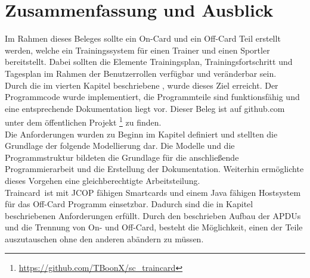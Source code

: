 \clearpage
\section{Zusammenfassung und Ausblick}
\label{sec:4}

Im Rahmen dieses Beleges sollte ein On-Card und ein Off-Card Teil erstellt werden, welche ein Trainingssystem für einen Trainer und einen Sportler bereitstellt.
Dabei sollten die Elemente Trainingsplan, Trainingsfortschritt und Tagesplan im Rahmen der Benutzerrollen verfügbar und veränderbar sein.
\\

Durch die im vierten Kapitel beschriebene , wurde dieses Ziel erreicht. Der Programmcode wurde implementiert, die Programmteile sind funktionsfähig und eine entsprechende Dokumentation liegt vor. Dieser Beleg ist auf github.com unter dem öffentlichen Projekt \footnote{\url{https://github.com/TBoonX/sc_traincard}} zu finden.
\\

Die Anforderungen wurden zu Beginn im Kapitel  definiert und stellten die Grundlage der folgende Modellierung dar.
Die Modelle und die Programmstruktur bildeten die Grundlage für die anschließende Programmierarbeit und die Erstellung der Dokumentation.
Weiterhin ermöglichte dieses Vorgehen eine gleichberechtigte Arbeitsteilung.
\\

\glqq Traincard\grqq \ ist mit JCOP fähigen Smartcards und einem Java fähigen Hostsystem für das Off-Card Programm einsetzbar.
Dadurch sind die in Kapitel  beschriebenen Anforderungen erfüllt.
Durch den beschrieben Aufbau der APDUs und die Trennung von On- und Off-Card, besteht die Möglichkeit, einen der Teile auszutauschen ohne den anderen abändern zu müssen.
\\

